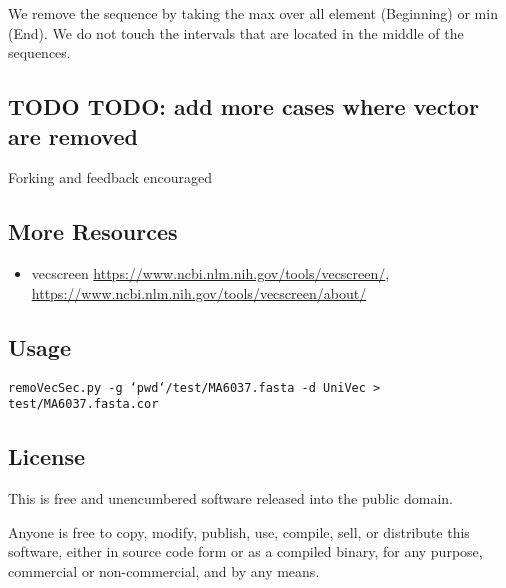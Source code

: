 \documentclass[11pt]{article}
\begin{document}
We remove the sequence by taking the max over all element (Beginning) or min (End).
We do not touch the intervals that are located in the middle of the sequences.

\subsection{{\bfseries\sffamily TODO} TODO: add more cases where vector are removed}
\label{sec:orge66a09c}

Forking and feedback encouraged

\subsection{More Resources}
\label{sec:org4aeef8c}


\begin{itemize}
\item vecscreen \url{https://www.ncbi.nlm.nih.gov/tools/vecscreen/}, \url{https://www.ncbi.nlm.nih.gov/tools/vecscreen/about/}
\end{itemize}

\subsection{Usage}
\label{sec:org6ba0a3b}

\texttt{remoVecSec.py -g `pwd`/test/MA6037.fasta   -d UniVec  > test/MA6037.fasta.cor}

\subsection{License}
\label{sec:org654c02e}

This is free and unencumbered software released into the public domain.

Anyone is free to copy, modify, publish, use, compile, sell, or
distribute this software, either in source code form or as a compiled
binary, for any purpose, commercial or non-commercial, and by any
means.
\end{document}
